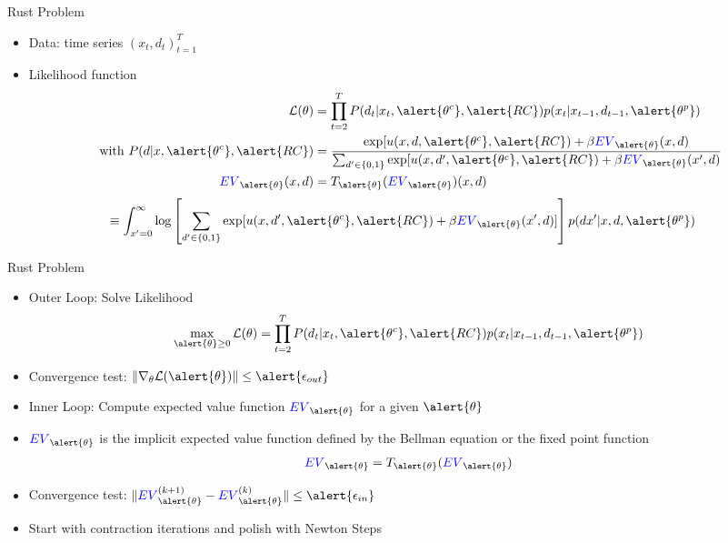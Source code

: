 \documentclass[xcolor=pdftex,dvipsnames,table,mathserif,aspectratio=169]{beamer}
\newcommand{\norm}[1]{\lVert#1\rVert}
\begin{document}
\begin{frame}{Rust Problem}
\begin{itemize}
\item Data: time series $(x_t,d_t)_{t=1}^T$
\item Likelihood function
\begin{align*}
\mathcal{L}(\theta) &= \prod_{t=2}^T P(d_t | x_t, \alert{\theta^c}, \alert{RC}) p(x_t | x_{t-1}, d_{t-1},\alert{\theta^p})\\
\mbox{ with }  P(d | x, \alert{\theta^c}, \alert{RC}) &= \frac{\exp[u(x,d,\alert{\theta^c},\alert{RC}) + \beta \textcolor{blue}{EV}_{\alert{\theta}}(x,d)}
{\sum_{d' \in \{0,1\}} \exp[u(x,d',\alert{\theta^c},\alert{RC}) + \beta \textcolor{blue}{EV}_{\alert{\theta}}(x',d)}\\
\textcolor{blue}{EV}_{\alert{\theta}}(x,d) &= T_{\alert{\theta}}(\textcolor{blue}{EV}_{\alert{\theta}})(x,d)\\
\end{align*}
\vspace{-1cm}
\begin{align*}
\equiv \int_{x'=0}^{\infty} &\log \left[ \sum_{d' \in \{0,1\}} \exp[u(x,d',\alert{\theta^c},\alert{RC}) + \beta \textcolor{blue}{EV}_{\alert{\theta}}(x',d)]  \right] p(dx' | x,d,\alert{\theta^p}) 
\end{align*}
\end{itemize}
\end{frame}


\begin{frame}{Rust Problem}
\begin{itemize}
\item Outer Loop: Solve Likelihood
\begin{align*}
\max_{\alert{\theta} \geq 0} \mathcal{L}(\theta) &= \prod_{t=2}^T P(d_t | x_t, \alert{\theta^c}, \alert{RC}) p(x_t | x_{t-1}, d_{t-1},\alert{\theta^p})\\
\end{align*}
\item Convergence test: $\norm{\nabla_{\theta} \mathcal{L}(\alert{\theta})} \leq \alert{\epsilon_{out}}$
\item Inner Loop: Compute expected value function $ \textcolor{blue}{EV}_{\alert{\theta}}$ for a given $\alert{\theta}$
\item $ \textcolor{blue}{EV}_{\alert{\theta}}$ is the implicit expected value function defined by the Bellman equation or the fixed point function
\begin{align*}
 \textcolor{blue}{EV}_{\alert{\theta}} = T_{\alert{\theta}}( \textcolor{blue}{EV}_{\alert{\theta}})
\end{align*}
\item Convergence test: $\norm{ \textcolor{blue}{EV}^{(k+1)}_{\alert{\theta}} - \textcolor{blue}{EV}^{(k)}_{\alert{\theta}} } \leq \alert{\epsilon_{in}}$
\item Start with contraction iterations and polish with Newton Steps
\end{itemize}
\end{frame}
\end{document}
